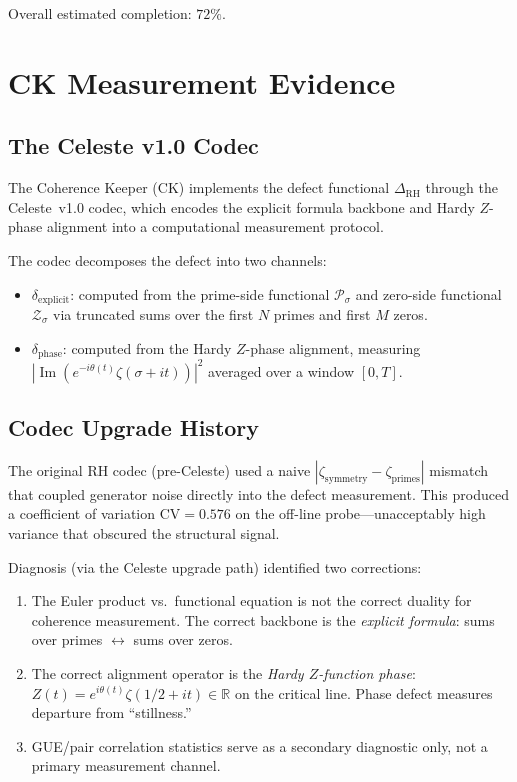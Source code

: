 \documentclass[11pt]{article}
\theoremstyle{remark}
\DeclareMathOperator{\Ima}{Im}
\begin{document}
\noindent Overall estimated completion: $72\%$.

\section{CK Measurement Evidence}
\label{sec:measurements}

\subsection{The Celeste v1.0 Codec}

The Coherence Keeper (CK) implements the defect functional $\Delta_{\mathrm{RH}}$
through the Celeste~v1.0 codec, which encodes the explicit formula backbone and
Hardy $Z$-phase alignment into a computational measurement protocol.

The codec decomposes the defect into two channels:
\begin{itemize}
  \item \textbf{$\delta_{\mathrm{explicit}}$}: computed from the prime-side functional
    $\mathcal{P}_\sigma$ and zero-side functional $\mathcal{Z}_\sigma$ via
    truncated sums over the first $N$ primes and first $M$ zeros.
  \item \textbf{$\delta_{\mathrm{phase}}$}: computed from the Hardy $Z$-phase
    alignment, measuring $|\Ima(e^{-i\theta(t)}\zeta(\sigma+it))|^2$ averaged over a
    window $[0,T]$.
\end{itemize}

\subsection{Codec Upgrade History}

The original RH codec (pre-Celeste) used a naive $|\zeta_{\mathrm{symmetry}}-\zeta_{\mathrm{primes}}|$
mismatch that coupled generator noise directly into the defect measurement.
This produced a coefficient of variation $\mathrm{CV}=0.576$ on the off-line probe---unacceptably
high variance that obscured the structural signal.

Diagnosis (via the Celeste upgrade path) identified two corrections:
\begin{enumerate}
  \item The Euler product vs.\ functional equation is not the correct duality for
    coherence measurement.
    The correct backbone is the \emph{explicit formula}: sums over primes $\leftrightarrow$ sums
    over zeros.
  \item The correct alignment operator is the \emph{Hardy $Z$-function phase}:
    $Z(t)=e^{i\theta(t)}\zeta(1/2+it)\in\mathbb{R}$ on the critical line.
    Phase defect measures departure from ``stillness.''
  \item GUE/pair correlation statistics serve as a secondary diagnostic only, not a
    primary measurement channel.
\end{enumerate}
\end{document}
